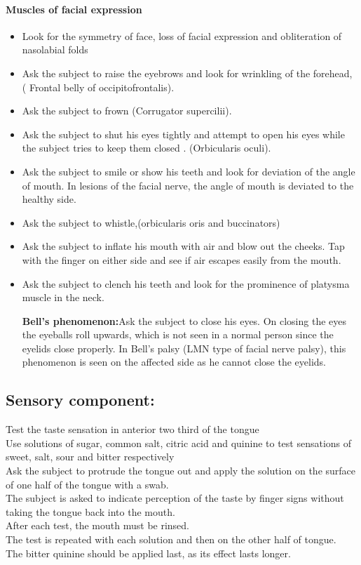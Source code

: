 \documentclass[a4paper,12pt,openany,oneside]{book}
\begin{document}
\paragraph{Muscles of facial expression}
\begin{itemize}
\item{Look for the symmetry of face, loss of facial expression and obliteration of nasolabial folds}
\item{Ask the subject to raise the eyebrows and look for wrinkling of the forehead, ( Frontal belly of occipitofrontalis).}
\item{Ask the subject to frown (Corrugator supercilii).}
\item{Ask the subject to shut his eyes tightly and attempt to open his eyes while the subject tries to keep them closed . (Orbicularis oculi).}
\item{Ask the subject to smile or show his teeth and look for deviation of the angle of mouth. In lesions of the facial nerve, the angle of mouth is deviated to the healthy side.}
\item{Ask the subject to whistle,(orbicularis oris and buccinators)}
\item{Ask the subject to inflate his mouth with air and blow out the cheeks. Tap with the finger on either side and see if air escapes easily from the mouth.}
\item{Ask the subject to clench his teeth and look for the prominence of platysma muscle in the neck.
	\par
		\textbf{Bell’s phenomenon:}Ask the subject to close his eyes. On closing the eyes the eyeballs roll upwards, which is not seen in a normal person since the eyelids close properly. In Bell’s palsy (LMN type of facial nerve palsy), this phenomenon is seen on the affected side as he cannot close the eyelids.}
\end{itemize}
\subsection*{Sensory component:}
Test the taste sensation in anterior two third of the tongue\\
Use solutions of sugar, common salt, citric acid and quinine to test sensations of sweet, salt, sour and bitter respectively\\
Ask the subject to protrude the tongue out and apply the solution on the surface of one half of the tongue with a swab.\\
The subject is asked to indicate perception of the taste by finger signs without taking the tongue back into the mouth.\\
After each test, the mouth must be rinsed.\\
The test is repeated with each solution and then on the other half of tongue.\\
The bitter quinine should be applied last, as its effect lasts longer.
\end{document}
